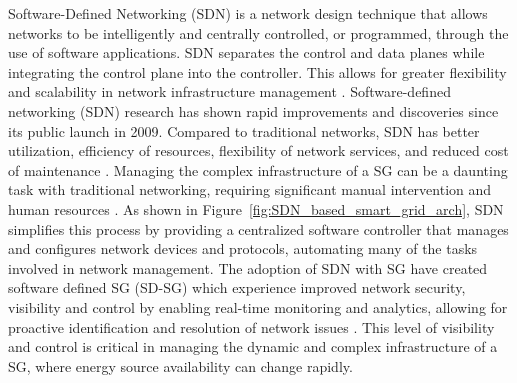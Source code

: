 \documentclass[conference]{IEEEtran}
\begin{document}
 Software-Defined Networking (SDN) is a network design technique that allows networks to be intelligently and centrally controlled, or programmed, through the use of software applications. SDN separates the control and data planes while integrating the control plane into the controller. This allows for greater flexibility and scalability in network infrastructure management \cite{maleh2022comprehensive}. Software-defined networking (SDN) research has shown rapid improvements and discoveries since its public launch in 2009. Compared to traditional networks, SDN has better utilization, efficiency of resources, flexibility of network services, and reduced cost of maintenance \cite{sun2020detecting}. Managing the complex infrastructure of a SG can be a daunting task with traditional networking, requiring significant manual intervention and human resources \cite{rehmani2019software}. As shown in Figure~\ref{fig:SDN_based_smart_grid_arch}, SDN simplifies this process by providing a centralized software controller that manages and configures network devices and protocols, automating many of the tasks involved in network management. The adoption of SDN with SG have created software defined SG (SD-SG) which experience improved network security, visibility and control by enabling real-time monitoring and analytics, allowing for proactive identification and resolution of network issues \cite{kabbara2022towards}. This level of visibility and control is critical in managing the dynamic and complex infrastructure of a SG, where energy source availability can change rapidly. 
\end{document}
